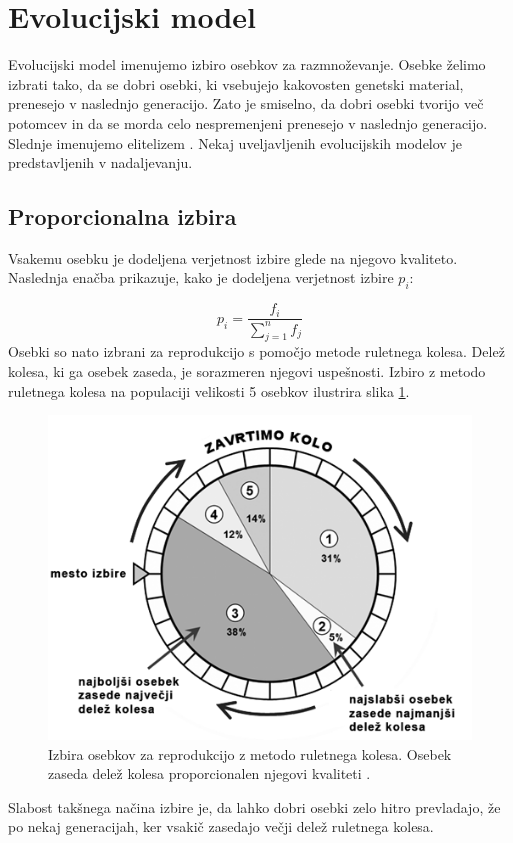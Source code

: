 \documentclass[a4paper, 12pt]{book}
\begin{document}
\section{Evolucijski model}
Evolucijski model imenujemo izbiro osebkov za razmno\v zevanje.
Osebke \v zelimo izbrati tako, da se dobri osebki, ki vsebujejo kakovosten genetski material, prenesejo v naslednjo generacijo. Zato je smiselno, da dobri osebki tvorijo ve\v c potomcev in da se morda celo nespremenjeni prenesejo v naslednjo generacijo. Slednje imenujemo elitelizem \cite{inteligentni sistemi}. Nekaj uveljavljenih evolucijskih modelov je predstavljenih v nadaljevanju.

\subsection{Proporcionalna izbira}
\label{seq:ruletno kolo}
Vsakemu osebku je dodeljena verjetnost izbire glede na njegovo kvaliteto. Naslednja ena\v cba prikazuje, kako je dodeljena verjetnost izbire $p_i$:

\begin{equation}
p_i = \frac{f_i}{\sum_{j=1}^n f_j}
\label{eq:proporcionalna izbira}
\end{equation}
Osebki so nato izbrani za reprodukcijo s pomo\v cjo metode ruletnega kolesa. Dele\v z kolesa, ki ga osebek zaseda, je sorazmeren njegovi uspe\v snosti. Izbiro z metodo ruletnega kolesa na populaciji velikosti 5 osebkov ilustrira slika \ref{ruletno kolo}.

\begin{figure}[h]
\begin{center}
\includegraphics[scale=0.50]{ruletno_kolo.png}
\end{center}
\caption{Izbira osebkov za reprodukcijo z metodo ruletnega kolesa. Osebek zaseda dele\v z kolesa proporcionalen njegovi kvaliteti \cite{slika ruletno kolo}.}
\label{ruletno kolo}
\end{figure}
Slabost tak\v snega na\v cina izbire je, da lahko dobri osebki zelo hitro prevladajo, \v ze po nekaj generacijah, ker vsaki\v c zasedajo ve\v cji dele\v z ruletnega kolesa.
\end{document}
